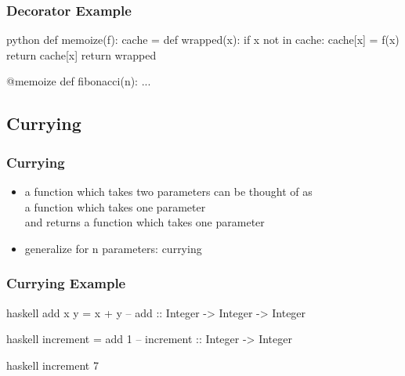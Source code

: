 \documentclass[dvipsnames]{beamer}
\theoremstyle{plain}
\begin{document}
\begin{frame}[fragile]
  \frametitle{Decorator Example}

  \begin{example}[memoization]
    \begin{pygments}{python}
def memoize(f):
    cache = {}
    def wrapped(x):
        if x not in cache:
            cache[x] = f(x)
        return cache[x]
    return wrapped

@memoize
def fibonacci(n):
    ...
    \end{pygments}
  \end{example}
\end{frame}

\subsection{Currying}

\begin{frame}
  \frametitle{Currying}

  \begin{itemize}
    \item a function which takes two parameters can be thought of as\\
      a function which takes one parameter\\
      and returns a function which takes one parameter
    \item generalize for n parameters: \alert{currying}
  \end{itemize}
\end{frame}

\begin{frame}[fragile]
  \frametitle{Currying Example}

  \begin{example}
    \begin{pygments}{haskell}
add x y = x + y
-- add :: Integer -> Integer -> Integer
    \end{pygments}

    \pause
    \medskip
    \begin{pygments}{haskell}
increment = add 1
-- increment :: Integer -> Integer
    \end{pygments}

    \pause
    \medskip
    \begin{pygments}{haskell}
increment 7
    \end{pygments}
  \end{example}
\end{frame}
\end{document}
